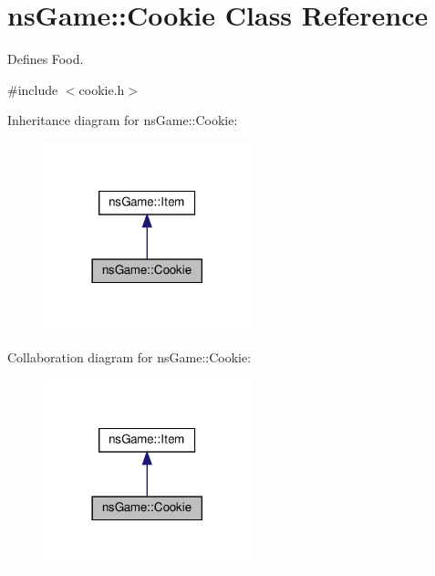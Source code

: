 \hypertarget{classns_game_1_1_cookie}{}\section{ns\+Game\+:\+:Cookie Class Reference}
\label{classns_game_1_1_cookie}


Defines Food.  




{\ttfamily \#include $<$cookie.\+h$>$}



Inheritance diagram for ns\+Game\+:\+:Cookie\+:\nopagebreak
\begin{figure}[H]
\begin{center}
\leavevmode
\includegraphics[width=170pt]{classns_game_1_1_cookie__inherit__graph}
\end{center}
\end{figure}


Collaboration diagram for ns\+Game\+:\+:Cookie\+:\nopagebreak
\begin{figure}[H]
\begin{center}
\leavevmode
\includegraphics[width=170pt]{classns_game_1_1_cookie__coll__graph}
\end{center}
\end{figure}
